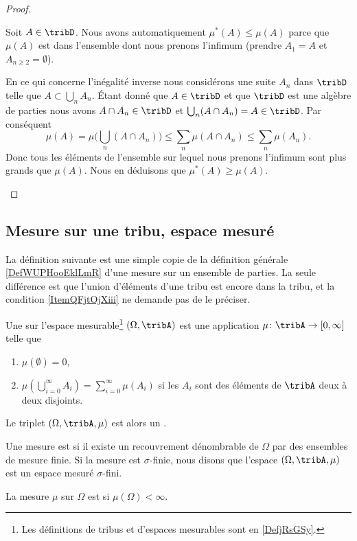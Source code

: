 \begin{proof}
\begin{subproof}
		\spitem[Restriction]
		Soit \( A\in\tribD\). Nous avons automatiquement \( \mu^*(A)\leq \mu(A)\) parce que \( \mu(A)\) est dans l'ensemble dont nous prenons l'infimum (prendre \( A_1=A\) et \( A_{n\geq 2}=\emptyset\)).

		En ce qui concerne l'inégalité inverse nous considérons une suite \( A_n\) dans \( \tribD\) telle que \( A\subset\bigcup_nA_n\). Étant donné que \( A\in\tribD\) et que \( \tribD\) est une algèbre de parties nous avons \( A\cap A_n\in \tribD\) et \( \bigcup_n(A\cap A_n)=A\in\tribD\). Par conséquent
		\begin{equation}
			\mu(A)=\mu\big( \bigcup_n(A\cap A_n) \big)\leq \sum_n\mu(A\cap A_n)\leq \sum_n\mu(A_n).
		\end{equation}
		Donc tous les éléments de l'ensemble sur lequel nous prenons l'infimum sont plus grands que \( \mu(A)\). Nous en déduisons que \( \mu^*(A)\geq \mu(A)\).
	\end{subproof}
\end{proof}

\subsection{Mesure sur une tribu, espace mesuré}

La définition suivante est une simple copie de la définition générale \ref{DefWUPHooEklLmR} d'une mesure sur un ensemble de parties. La seule différence est que l'union d'éléments d'une tribu est encore dans la tribu, et la condition \ref{ItemQFjtOjXiii} ne demande pas de le préciser.

\begin{definition}  \label{DefBTsgznn}
	Une  sur l'espace mesurable\footnote{Les définitions de tribus et d'espaces mesurables sont en \ref{DefjRsGSy}.} \( (\Omega,\tribA)\) est une application \( \mu\colon \tribA\to \mathopen[ 0 , \infty \mathclose]\) telle que
	\begin{enumerate}
		\item
		      \( \mu(\emptyset)=0\),
		\item       \label{ItemQFjtOjXiii}
		      \( \mu\left( \bigcup_{i=0}^{\infty}A_i\right)=\sum_{i=0}^{\infty}\mu(A_i)\) si les \( A_i\) sont des éléments de \( \tribA\) deux à deux disjoints.
	\end{enumerate}
	Le triplet \( (\Omega,\tribA,\mu)\) est alors un .

	Une mesure est  si il existe un recouvrement dénombrable de \( \Omega\) par des ensembles de mesure finie. Si la mesure est \( \sigma\)-finie, nous disons que l'espace \( (\Omega,\tribA,\mu)\) est un espace mesuré \( \sigma\)-fini.

	La mesure \( \mu\) sur \( \Omega\) est  si \( \mu(\Omega)<\infty\).
\end{definition}

